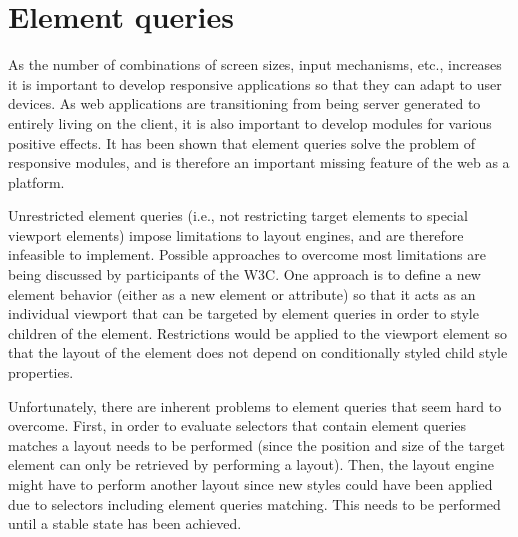 \documentclass[a4paper,11pt]{kth-mag}
\begin{document}






    \section{Element queries}
    As the number of combinations of screen sizes, input mechanisms, etc., increases it is important to develop \gls{responsive} applications so that they can adapt to user devices.
    As \gls{web} applications are transitioning from being server generated to entirely living on the client, it is also important to develop modules for various positive effects.
    It has been shown that element queries solve the problem of \gls{responsive} modules, and is therefore an important missing feature of the \gls{web} as a platform.

    Unrestricted element queries (i.e., not restricting target \glspl{element} to special \gls{viewport} \glspl{element}) impose limitations to \glspl{layout engine}, and are therefore infeasible to implement.
    Possible approaches to overcome most limitations are being discussed by participants of the W3C.
    One approach is to define a new element behavior (either as a new element or attribute) so that it acts as an individual \gls{viewport} that can be targeted by element queries in order to style children of the \gls{element}.
    Restrictions would be applied to the \gls{viewport} element so that the layout of the element does not depend on conditionally styled child style properties.

    Unfortunately, there are inherent problems to element queries that seem hard to overcome.
    First, in order to evaluate selectors that contain element queries matches a layout needs to be performed (since the position and size of the target element can only be retrieved by performing a layout).
    Then, the \gls{layout engine} might have to perform another layout since new styles could have been applied due to selectors including element queries matching.
    This needs to be performed until a stable state has been achieved.
\end{document}
